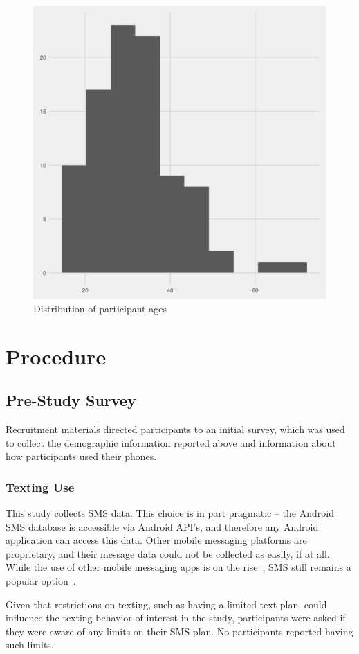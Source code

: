 \documentclass[12pt]{nuthesis}	%
\begin{document}
\begin{figure}[h]
\centering
\includegraphics[width=.7\textwidth]{figures/age_distribution}
\caption{Distribution of participant ages}
\label{fig:age}
\end{figure}


\section{Procedure}

\subsection{Pre-Study Survey}

Recruitment materials directed participants to an initial survey, which was used to collect the demographic information reported above and information about how participants used their phones.

\subsubsection{Texting Use}
This study collects SMS data. This choice is in part pragmatic -- the Android SMS database is accessible via Android API's, and therefore any Android application can access this data. Other mobile messaging platforms are proprietary, and their message data could not be collected as easily, if at all. While the use of other mobile messaging apps is on the rise~\citep{duggan2015mobile}, SMS still remains a popular option~\citep{smith2015us}. 

Given that restrictions on texting, such as having a limited text plan, could influence the texting behavior of interest in the study, participants were asked if they were aware of any limits on their SMS plan. No participants reported having such limits.
\end{document}
